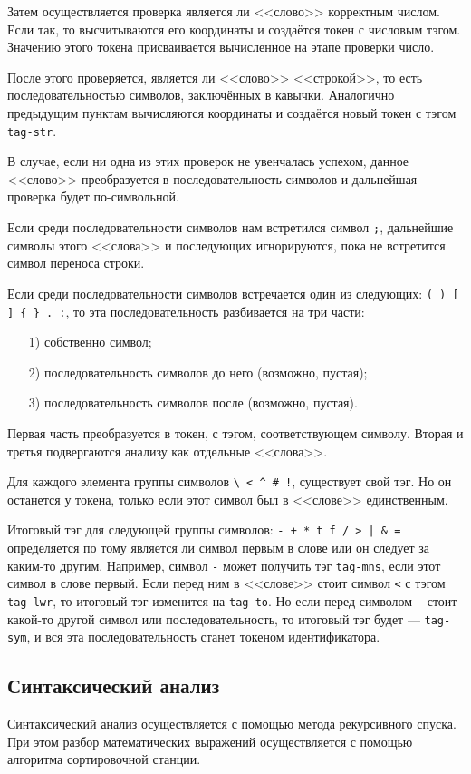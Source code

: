     Затем осуществляется проверка является ли <<слово>> корректным числом.
    Если так, то высчитываются его координаты и создаётся токен с числовым тэгом.
    Значению этого токена присваивается вычисленное на этапе проверки число.

    После этого проверяется, является ли <<слово>> <<строкой>>, то есть последовательностью символов, заключённых в кавычки.
    Аналогично предыдущим пунктам вычисляются координаты и создаётся новый токен с тэгом \verb$tag-str$.

    В случае, если ни одна из этих проверок не увенчалась успехом, данное <<слово>> преобразуется в последовательность символов и дальнейшая проверка будет по-символьной.

    Если среди последовательности символов нам встретился символ \verb$;$, дальнейшие символы этого <<слова>> и последующих игнорируются, пока не встретится символ переноса строки.

    Если среди последовательности символов встречается один из следующих: \verb!( ) [ ] { } . :!, то эта последовательность разбивается на три части:
    \begin{enumerate}
        \item[1)] собственно символ;
        \item[2)] последовательность символов до него (возможно, пустая);
        \item[3)] последовательность символов после (возможно, пустая).
    \end{enumerate}
    Первая часть преобразуется в токен, с тэгом, соответствующем символу.
    Вторая и третья подвергаются анализу как отдельные <<слова>>.

    Для каждого элемента группы символов \verb,\ < ^ # !,, существует свой тэг.
    Но он останется у токена, только если этот символ был в <<слове>> единственным.

    Итоговый тэг для следующей группы символов: \verb!- + * t f / > | & =! определяется по тому является ли символ первым в слове или он следует за каким-то другим.
    Например, символ \verb$-$ может получить тэг \verb$tag-mns$, если этот символ в слове первый.
    Если перед ним в <<слове>> стоит символ \verb$<$ с тэгом \verb$tag-lwr$, то итоговый тэг изменится на \verb$tag-to$.
    Но если перед символом \verb$-$ стоит какой-то другой символ или последовательность, то итоговый тэг будет --- \verb$tag-sym$, и вся эта последовательность станет токеном идентификатора.
    
    \subsection{Синтаксический анализ}
    Синтаксический анализ осуществляется с помощью метода рекурсивного спуска.
    При этом разбор математических выражений осуществляется с помощью алгоритма сортировочной станции.
